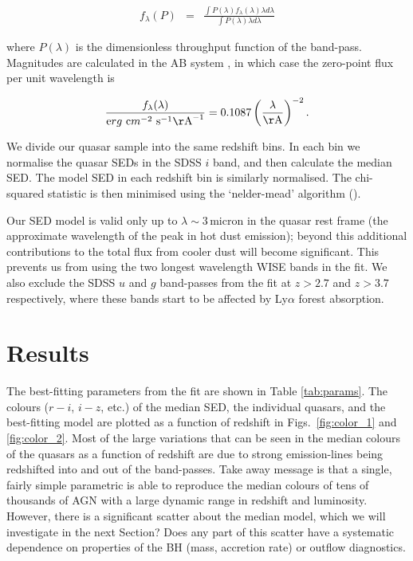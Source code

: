 \begin{eqnarray}
  \label{eq:flux}
  f_{\lambda}(P) & = & \frac{\int P(\lambda) f_\lambda(\lambda) \lambda d\lambda }{\int P(\lambda) \lambda d\lambda}
\end{eqnarray}

where $P(\lambda)$ is the dimensionless throughput function of the band-pass. 
Magnitudes are calculated in the AB system \citep{oke83}, in which case the zero-point flux per unit wavelength is 

\begin{eqnarray}
  \frac{f_\lambda(\lambda)}{{\mathrm erg}~{\mathrm cm}^{-2}~{\mathrm s}^{-1} {\mathrm\AA}^{-1}} = 0.1087 \left(\frac{\lambda}{\mathrm \AA}\right)^{-2}.
\end{eqnarray}


We divide our quasar sample into the same redshift bins.
In each bin we normalise the quasar SEDs in the SDSS $i$ band, and then calculate the median SED. 
The model SED in each redshift bin is similarly normalised. 
The chi-squared statistic is then minimised using the `nelder-mead' algorithm (). 

Our SED model is valid only up to $\lambda \sim 3$\,micron in the quasar rest frame (the approximate wavelength of the peak in hot dust emission); beyond this additional contributions to the total flux from cooler dust will become significant. 
This prevents us from using the two longest wavelength WISE bands in the fit. 
We also exclude the SDSS $u$ and $g$ band-passes from the fit at $z > 2.7$ and $z > 3.7$ respectively, where these bands start to be affected by Ly$\alpha$ forest absorption.

\section{Results}

The best-fitting parameters from the fit are shown in Table \ref{tab:params}. 
The colours ($r-i$, $i-z$, etc.) of the median SED, the individual quasars, and the best-fitting model are plotted as a function of redshift in Figs.~\ref{fig:color_1} and \ref{fig:color_2}.
Most of the large variations that can be seen in the median colours of the quasars as a function of redshift are due to strong emission-lines being redshifted into and out of the band-passes.
Take away message is that a single, fairly simple parametric is able to reproduce the median colours of tens of thousands of AGN with a large dynamic range in redshift and luminosity. 
However, there is a significant scatter about the median model, which we will investigate in the next Section?
Does any part of this scatter have a systematic dependence on properties of the BH (mass, accretion rate) or outflow diagnostics.  

